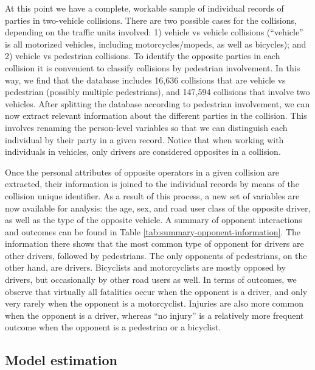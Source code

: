 \documentclass[]{elsarticle} %
\begin{document}
At this point we have a complete, workable sample of individual records
of parties in two-vehicle collisions. There are two possible cases for
the collisions, depending on the traffic units involved: 1) vehicle vs
vehicle collisions (``vehicle'' is all motorized vehicles, including
motorcycles/mopeds, as well as bicycles); and 2) vehicle vs pedestrian
collisions. To identify the opposite parties in each collision it is
convenient to classify collisions by pedestrian involvement. In this
way, we find that the database includes 16,636 collisions that are
vehicle vs pedestrian (possibly multiple pedestrians), and 147,594
collisions that involve two vehicles. After splitting the database
according to pedestrian involvement, we can now extract relevant
information about the different parties in the collision. This involves
renaming the person-level variables so that we can distinguish each
individual by their party in a given record. Notice that when working
with individuals in vehicles, only drivers are considered opposites in a
collision.

Once the personal attributes of opposite operators in a given collision
are extracted, their information is joined to the individual records by
means of the collision unique identifier. As a result of this process, a
new set of variables are now available for analysis: the age, sex, and
road user class of the opposite driver, as well as the type of the
opposite vehicle. A summary of opponent interactions and outcomes can be
found in Table \ref{tab:summary-opponent-information}. The information
there shows that the most common type of opponent for drivers are other
drivers, followed by pedestrians. The only opponents of pedestrians, on
the other hand, are drivers. Bicyclists and motorcyclists are mostly
opposed by drivers, but occasionally by other road users as well. In
terms of outcomes, we observe that virtually all fatalities occur when
the opponent is a driver, and only very rarely when the opponent is a
motorcyclist. Injuries are also more common when the opponent is a
driver, whereas ``no injury'' is a relatively more frequent outcome when
the opponent is a pedestrian or a bicyclist.

\hypertarget{sec:model-estimation}{%
\subsection{Model estimation}\label{sec:model-estimation}}
\end{document}
